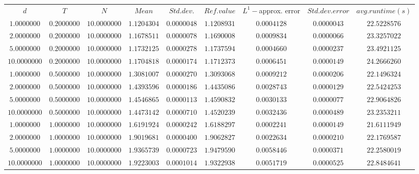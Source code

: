 \begin{tabular}{ccccccccc}
$d$ & $T$ & $N$ & $Mean$ & $Std. dev.$ & $Ref. value$ & $L^1-$approx. error & $Std. dev. error$ & $avg. runtime (s)$\\
$1.0000000$ & $0.2000000$ & $10.0000000$ & $1.1204304$ & $0.0000048$ & $1.1208931$ & $0.0004128$ & $0.0000043$ & $22.5228576$\\
$2.0000000$ & $0.2000000$ & $10.0000000$ & $1.1678511$ & $0.0000078$ & $1.1690008$ & $0.0009834$ & $0.0000066$ & $23.3257022$\\
$5.0000000$ & $0.2000000$ & $10.0000000$ & $1.1732125$ & $0.0000278$ & $1.1737594$ & $0.0004660$ & $0.0000237$ & $23.4921125$\\
$10.0000000$ & $0.2000000$ & $10.0000000$ & $1.1704818$ & $0.0000174$ & $1.1712373$ & $0.0006451$ & $0.0000149$ & $24.2666260$\\
$1.0000000$ & $0.5000000$ & $10.0000000$ & $1.3081007$ & $0.0000270$ & $1.3093068$ & $0.0009212$ & $0.0000206$ & $22.1496324$\\
$2.0000000$ & $0.5000000$ & $10.0000000$ & $1.4393596$ & $0.0000186$ & $1.4435086$ & $0.0028743$ & $0.0000129$ & $22.5424253$\\
$5.0000000$ & $0.5000000$ & $10.0000000$ & $1.4546865$ & $0.0000113$ & $1.4590832$ & $0.0030133$ & $0.0000077$ & $22.9064826$\\
$10.0000000$ & $0.5000000$ & $10.0000000$ & $1.4473142$ & $0.0000710$ & $1.4520239$ & $0.0032436$ & $0.0000489$ & $23.2353211$\\
$1.0000000$ & $1.0000000$ & $10.0000000$ & $1.6191924$ & $0.0000242$ & $1.6188297$ & $0.0002241$ & $0.0000149$ & $21.6111949$\\
$2.0000000$ & $1.0000000$ & $10.0000000$ & $1.9019681$ & $0.0000400$ & $1.9062827$ & $0.0022634$ & $0.0000210$ & $22.1769587$\\
$5.0000000$ & $1.0000000$ & $10.0000000$ & $1.9365739$ & $0.0000723$ & $1.9479590$ & $0.0058446$ & $0.0000371$ & $22.2580019$\\
$10.0000000$ & $1.0000000$ & $10.0000000$ & $1.9223003$ & $0.0001014$ & $1.9322938$ & $0.0051719$ & $0.0000525$ & $22.8484641$\\
\end{tabular}
